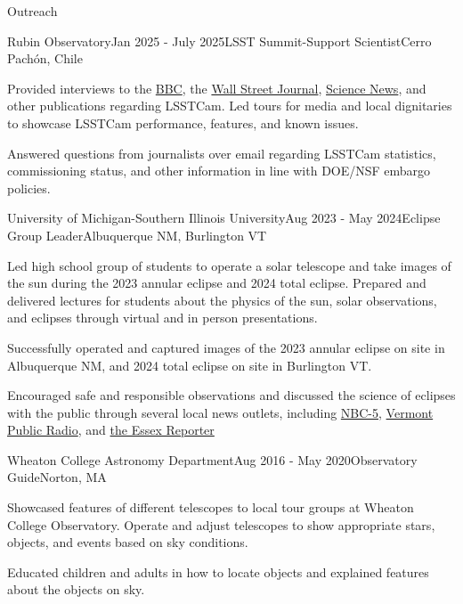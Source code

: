 \documentclass{resume} %
\begin{document}
\begin{rSection}{Outreach}

\begin{rSubsection}{Rubin Observatory}{Jan 2025 - July 2025}{LSST Summit-Support Scientist}{Cerro Pachón, Chile}
    \item Provided interviews to the \href{https://youtu.be/6RBZqhIgllI?si=WJu_PTFMFdWa_h7s}{BBC}, the \href{https://www.wsj.com/science/space-astronomy/worlds-largest-digital-camera-snaps-its-first-photos-of-the-universe-68099904?mod=Searchresults_pos1&page=1}{Wall Street Journal}, \href{https://www.sciencenews.org/article/vera-rubin-observatory-digital-camera}{Science News}, and other publications regarding \ac{LSSTCam}. Led tours for media and local dignitaries to showcase LSSTCam performance, features, and known issues.
    \item Answered questions from journalists over email regarding LSSTCam statistics, commissioning status, and other information in line with DOE/NSF embargo policies.
\end{rSubsection}

\begin{rSubsection}{University of Michigan-Southern Illinois University}{Aug 2023 - May 2024}{Eclipse Group Leader}{Albuquerque NM, Burlington VT}
    \item Led high school group of students to operate a solar telescope and take images of the sun during the 2023 annular eclipse and 2024 total eclipse. Prepared and delivered lectures for students about the physics of the sun, solar observations, and eclipses through virtual and in person presentations.
    \item Successfully operated and captured images of the 2023 annular eclipse on site in Albuquerque NM, and 2024 total eclipse on site in Burlington VT.
    \item Encouraged safe and responsible observations and discussed the science of eclipses with the public through several local news outlets, including \href{https://www.mynbc5.com/article/total-eclipse-nasa/60433342?utm_campaign=snd-autopilot}{NBC-5}, \href{https://www.vermontpublic.org/local-news/2024-04-10/nasa-volunteer-photo-eclipse-burlington-sun-atmosphere}{Vermont Public Radio}, and \href{https://www.essexreporter.com/news/physics-masters-student-collects-data-for-nasa-and-national-science-foundation-from-eclipse-in-burlington/article_1b7a72a8-76d5-52b7-8ffa-886491f640a4.html}{the Essex Reporter}
\end{rSubsection}



\begin{rSubsection}{Wheaton College Astronomy Department}{Aug 2016 - May 2020}{Observatory Guide}{Norton, MA}
    \item Showcased features of different telescopes to local tour groups at Wheaton College Observatory. Operate and adjust telescopes to show appropriate stars, objects, and events based on sky conditions.
    \item Educated children and adults in how to locate objects and explained features about the objects on sky.
\end{rSubsection}
\end{rSection}
\end{document}
